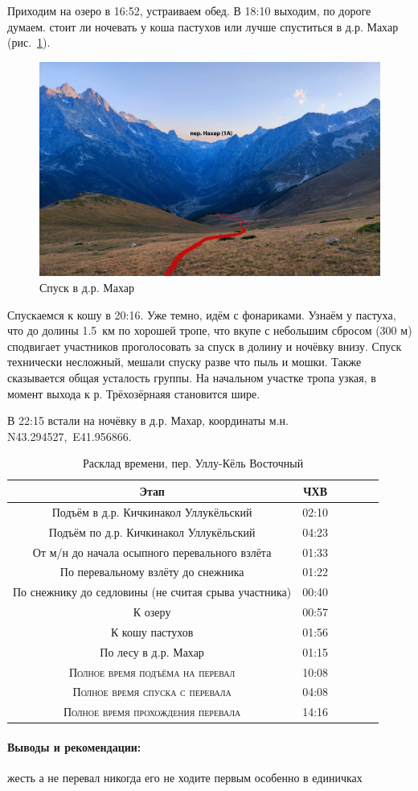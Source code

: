 Приходим на озеро в 16:52, устраиваем обед. В 18:10 выходим, по дороге думаем. стоит ли ночевать у коша пастухов или лучше спуститься в д.р. Махар (рис.~\ref{fig:IMG_20240820_184645.jpg}).

\begin{figure}[h!]
	\centering
	\includegraphics[width=0.7\linewidth]{../pics/IMG_20240820_184645.jpg}
	\caption{Спуск в д.р. Махар}
	\label{fig:IMG_20240820_184645.jpg}
\end{figure}

Спускаемся к кошу в 20:16. Уже темно, идём с фонариками. Узнаём у пастуха, что до долины 1.5~км по хорошей тропе, что вкупе с небольшим сбросом (300 м) сподвигает участников проголосовать за спуск в долину и ночёвку внизу. Спуск технически несложный, мешали спуску разве что пыль и мошки. Также сказывается общая усталость группы. На начальном участке тропа узкая, в момент выхода к р. Трёхозёрнаяя становится шире.

В 22:15 встали на ночёвку в д.р. Махар, координаты м.н. N43.294527\degree,~E41.956866\degree.

\clearpage 

\begin{table}[h!]
	\centering
	\begin{tabular}{|c|c|c|c|c|c|} 
		\hline 
		Этап & ЧХВ \\ 	
		\hline 
		Подъём в д.р. Кичкинакол Уллукёльский  & 02:10 \\
		Подъём по д.р. Кичкинакол Уллукёльский  & 04:23 \\
		От м/н до начала осыпного перевального взлёта & 01:33\\ 
		По перевальному взлёту до снежника & 01:22\\ 
		По снежнику до седловины (не считая срыва участника) & 00:40\\ 
		К озеру & 00:57 \\
		К кошу пастухов & 01:56 \\
		По лесу в д.р. Махар & 01:15 \\
		\hline
		\textsc{Полное время подъёма на перевал  }& 10:08\\
		\textsc{Полное время спуска с перевала }& 04:08 \\
	\textsc{	Полное время прохождения перевала }& 14:16 \\
		\hline
	\end{tabular}
	\caption{Расклад времени, пер. Уллу-Кёль Восточный}
\end{table}

\paragraph{Выводы и рекомендации:} жесть а не перевал никогда его не ходите первым особенно в единичках

\clearpage
